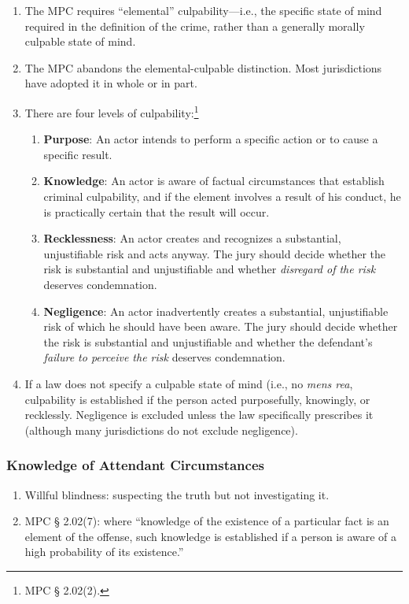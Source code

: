 \begin{enumerate}
    \item The MPC requires ``elemental'' culpability---i.e., the specific state of mind required in the definition of the crime, rather than a generally morally culpable state of mind.
    \item The MPC abandons the elemental-culpable distinction. Most jurisdictions have adopted it in whole or in part.
    \item There are four levels of culpability:\footnote{MPC § 2.02(2).}
    \begin{enumerate}
        \item \textbf{Purpose}: An actor intends to perform a specific action or to cause a specific result.
        \item \textbf{Knowledge}: An actor is aware of factual circumstances that establish criminal culpability, and if the element involves a result of his conduct, he is practically certain that the result will occur. 
        \item \textbf{Recklessness}: An actor creates and recognizes a substantial, unjustifiable risk and acts anyway. The jury should decide whether the risk is substantial and unjustifiable and whether \emph{disregard of the risk} deserves condemnation. 
        \item \textbf{Negligence}: An actor inadvertently creates a substantial, unjustifiable risk of which he should have been aware. The jury should decide whether the risk is substantial and unjustifiable and whether the defendant's \emph{failure to perceive the risk} deserves condemnation.
    \end{enumerate}
    \item If a law does not specify a culpable state of mind (i.e., no \emph{mens rea}, culpability is established if the person acted purposefully, knowingly, or recklessly. Negligence is excluded unless the law specifically prescribes it (although many jurisdictions do not exclude negligence).
\end{enumerate}

\subsubsection{Knowledge of Attendant Circumstances}

\begin{enumerate}
    \item Willful blindness: suspecting the truth but not investigating it.
    \item MPC § 2.02(7): where ``knowledge of the existence of a particular fact is an element of the offense, such knowledge is established if a person is aware of a high probability of its existence.''
\end{enumerate}

